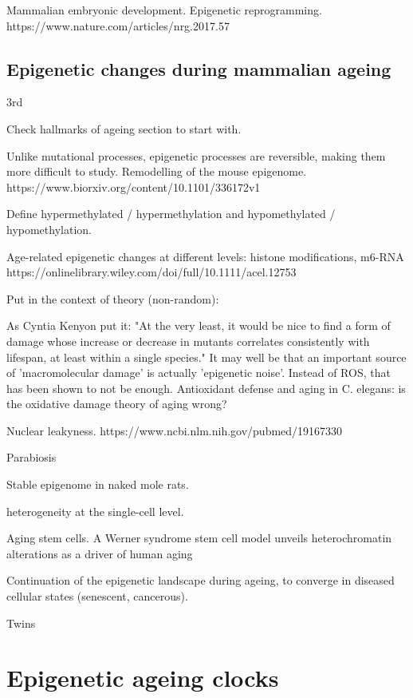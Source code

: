 Mammalian embryonic development. Epigenetic reprogramming.
https://www.nature.com/articles/nrg.2017.57

\subsection{Epigenetic changes during mammalian ageing}

3rd

Check hallmarks of ageing section to start with.

Unlike mutational processes, epigenetic processes are reversible, making them more difficult to study.
Remodelling of the mouse epigenome. 
https://www.biorxiv.org/content/10.1101/336172v1

Define hypermethylated / hypermethylation and hypomethylated / hypomethylation.

Age-related epigenetic changes at different levels: histone modifications, m6-RNA https://onlinelibrary.wiley.com/doi/full/10.1111/acel.12753

Put in the context of theory (non-random): %


As Cyntia Kenyon put it: "At the very least, it would be nice to find a form of damage whose increase or decrease in mutants correlates consistently with lifespan, at least within a single species." \cite{Kenyon2010}
It may well be that an important source of 'macromolecular damage' is actually 'epigenetic noise'. 
Instead of ROS, that has been shown to not be enough. 
Antioxidant defense and aging in C. elegans: is the oxidative damage theory of aging wrong?

Nuclear leakyness. 
https://www.ncbi.nlm.nih.gov/pubmed/19167330

Parabiosis

Stable epigenome in naked mole rats.

heterogeneity at the single-cell level.

Aging stem cells. A Werner syndrome stem cell model unveils heterochromatin alterations as a driver of human aging

Continuation of the epigenetic landscape during ageing, to converge in diseased cellular states (senescent, cancerous).

Twins

\section{Epigenetic ageing clocks}

